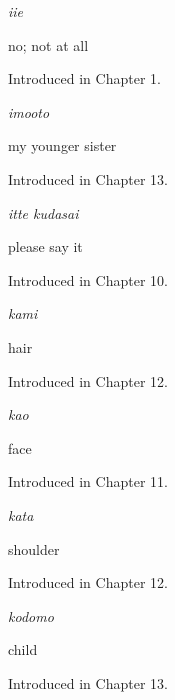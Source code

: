 \noindent\begin{minipage}[t]{\linewidth}
\raggedright
\textbf{}\enspace\emph{iie}\par
\small no; not at all\par
\footnotesize Introduced in Chapter 1.
\end{minipage}\par\medskip

\noindent\begin{minipage}[t]{\linewidth}
\raggedright
\textbf{}\enspace\emph{imooto}\par
\small my younger sister\par
\footnotesize Introduced in Chapter 13.
\end{minipage}\par\medskip

\noindent\begin{minipage}[t]{\linewidth}
\raggedright
\textbf{}\enspace\emph{itte kudasai}\par
\small please say it\par
\footnotesize Introduced in Chapter 10.
\end{minipage}\par\medskip

\noindent\begin{minipage}[t]{\linewidth}
\raggedright
\textbf{}\enspace\emph{kami}\par
\small hair\par
\footnotesize Introduced in Chapter 12.
\end{minipage}\par\medskip

\noindent\begin{minipage}[t]{\linewidth}
\raggedright
\textbf{}\enspace\emph{kao}\par
\small face\par
\footnotesize Introduced in Chapter 11.
\end{minipage}\par\medskip

\noindent\begin{minipage}[t]{\linewidth}
\raggedright
\textbf{}\enspace\emph{kata}\par
\small shoulder\par
\footnotesize Introduced in Chapter 12.
\end{minipage}\par\medskip

\noindent\begin{minipage}[t]{\linewidth}
\raggedright
\textbf{}\enspace\emph{kodomo}\par
\small child\par
\footnotesize Introduced in Chapter 13.
\end{minipage}\par\medskip

